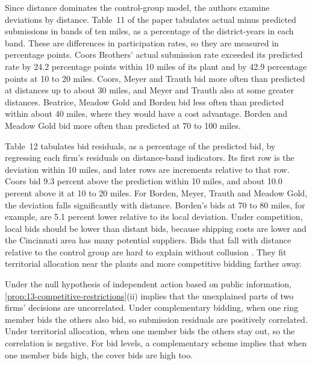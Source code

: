 Since distance dominates the control-group model, the authors examine deviations by distance. Table~11 of the paper
tabulates actual minus predicted submissions in bands of ten miles, as a percentage of the district-years in each
band. These are differences in participation rates, so they are measured in percentage points. Coors Brothers'
actual submission rate exceeded its predicted rate by 24.2 percentage points within 10 miles of its plant and by
42.9 percentage points at 10 to 20 miles. Coors, Meyer and Trauth bid more often than predicted at distances up to about 30 miles,
and Meyer and Trauth also at some greater distances. Beatrice, Meadow Gold and Borden bid less often than predicted
within about 40 miles, where they would have a cost advantage. Borden and Meadow Gold bid more often than predicted
at 70 to 100 miles.

Table~12 tabulates bid residuals, as a percentage of the predicted bid, by regressing each firm's residuals on
distance-band indicators. Its first row is the deviation within 10 miles, and later rows are increments relative to
that row. Coors bid 9.3 percent above the prediction within 10 miles, and about 10.0 percent above it at 10 to 20
miles. For Borden, Meyer, Trauth and Meadow Gold, the deviation falls significantly with distance. Borden's bids at 70
to 80 miles, for example, are 5.1 percent lower relative to its local deviation. Under competition, local bids
should be lower than distant bids, because shipping costs are lower and the Cincinnati area has many potential
suppliers. Bids that fall with distance relative to the control group are hard to explain without collusion
\citep[p.~28]{PorterZona1999}. They fit territorial allocation near the plants and more competitive bidding farther
away.

Under the null hypothesis of independent action based on public information, \cref{prop:13-competitive-restrictions}(ii)
implies that the unexplained parts of two firms' decisions are uncorrelated. Under complementary bidding, when one
ring member bids the others also bid, so submission residuals are positively correlated. Under territorial
allocation, when one member bids the others stay out, so the correlation is negative. For bid levels, a complementary
scheme implies that when one member bids high, the cover bids are high too.

